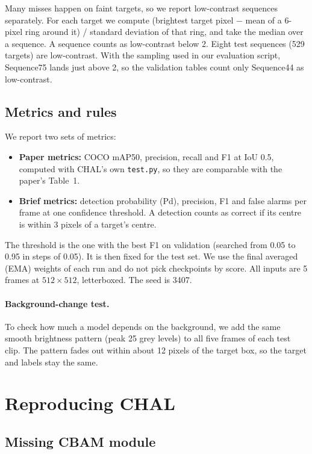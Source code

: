 \documentclass[11pt,a4paper]{article}
\begin{document}
Many misses happen on faint targets, so we report low-contrast sequences separately. For each target we compute
(brightest target pixel $-$ mean of a 6-pixel ring around it) / standard deviation of that ring, and take the
median over a sequence. A sequence counts as low-contrast below 2. Eight test sequences (529 targets) are
low-contrast. With the sampling used in our evaluation script, Sequence75 lands just above 2, so the validation
tables count only Sequence44 as low-contrast.

\subsection{Metrics and rules}

We report two sets of metrics:
\begin{itemize}
  \item \textbf{Paper metrics:} COCO mAP50, precision, recall and F1 at IoU 0.5, computed with CHAL's own
        \texttt{test.py}, so they are comparable with the paper's Table~1.
  \item \textbf{Brief metrics:} detection probability (Pd), precision, F1 and false alarms per frame at one
        confidence threshold. A detection counts as correct if its centre is within 3 pixels of a target's
        centre.
\end{itemize}

The threshold is the one with the best F1 on validation (searched from 0.05 to 0.95 in steps of 0.05). It is then
fixed for the test set. We use the final averaged (EMA) weights of each run and do not pick checkpoints by score.
All inputs are 5 frames at $512\times512$, letterboxed. The seed is 3407.

\paragraph{Background-change test.} To check how much a model depends on the background, we add the same smooth
brightness pattern (peak 25 grey levels) to all five frames of each test clip. The pattern fades out within about
12 pixels of the target box, so the target and labels stay the same.

\section{Reproducing CHAL}

\subsection{Missing CBAM module}
\end{document}
